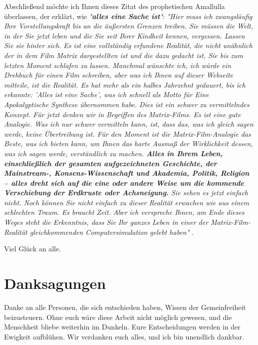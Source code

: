 \documentclass[10pt,twocolumn,letterpaper]{article}
\begin{document}
Abschließend möchte ich Ihnen dieses Zitat des prophetischen Amallulla überlassen, der erklärt, wie \textit{"\textbf{alles eine Sache ist}"}: \textit{"Hier muss ich zwangsläufig Ihre Vorstellungskraft bis an die äußersten Grenzen treiben. Sie müssen die Welt, in der Sie jetzt leben und die Sie seit Ihrer Kindheit kennen, vergessen. Lassen Sie sie hinter sich. Es ist eine vollständig erfundene Realität, die nicht unähnlich der in dem Film Matrix dargestellten ist und die dazu gedacht ist, Sie bis zum letzten Moment schlafen zu lassen. Manchmal wünschte ich, ich würde ein Drehbuch für einen Film schreiben, aber was ich Ihnen auf dieser Webseite mitteile, ist die Realität. Es hat mehr als ein halbes Jahrzehnt gedauert, bis ich erkannte: 'Alles ist eine Sache', was ich schnell als Motto für Eine Apokalyptische Synthese übernommen habe. Dies ist ein schwer zu vermittelndes Konzept. Für jetzt denken wir in Begriffen des Matrix-Films. Es ist eine gute Analogie. Was ich nur schwer vermitteln kann, ist, dass das, was ich gleich sagen werde, keine Übertreibung ist. Für den Moment ist die Matrix-Film-Analogie das Beste, was ich bieten kann, um Ihnen das harte Ausmaß der Wirklichkeit dessen, was ich sagen werde, verständlich zu machen. \textbf{Alles in Ihrem Leben, einschließlich der gesamten aufgezeichneten Geschichte, der Mainstream-, Konsens-Wissenschaft und Akademia, Politik, Religion – alles dreht sich auf die eine oder andere Weise um die kommende Verschiebung der Erdkruste oder Achsneigung.} Sie sehen es jetzt einfach nicht. Noch können Sie nicht einfach zu dieser Realität erwachen wie aus einem schlechten Traum. Es braucht Zeit. Aber ich verspreche Ihnen, am Ende dieses Weges steht die Erkenntnis, dass Sie Ihr ganzes Leben in einer der Matrix-Film-Realität gleichkommenden Computersimulation gelebt haben"} \cite{33,34}.

Viel Glück an alle.

\section{Danksagungen}

Danke an alle Personen, die sich entschieden haben, Wissen der Gemeinfreiheit beizusteuern. Ohne euch wäre diese Arbeit nicht möglich gewesen, und die Menschheit bliebe weiterhin im Dunkeln. Eure Entscheidungen werden in der Ewigkeit aufblühen. Wir verdanken euch alles, und ich bin unendlich dankbar.

\clearpage
\twocolumn

{\small
\renewcommand{\refname}{Literaturverzeichnis}


}
\end{document}
